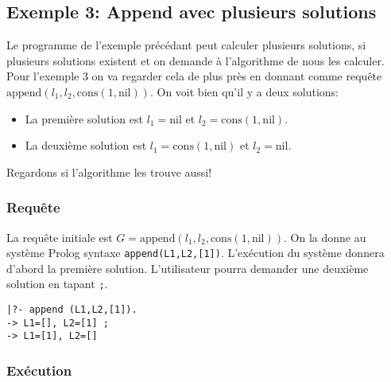 \begin{center}
\noindent{}
\end{center}

\subsection{Exemple 3: Append avec plusieurs solutions}

Le programme de l'exemple précédant peut calculer plusieurs solutions,
si plusieurs solutions existent et on demande à l'algorithme de nous les calculer.
Pour l'exemple 3 on va regarder cela de plus près
en donnant comme requête $\mathrm{append}(l_1, l_2, \mathrm{cons}(1,\mathrm{nil}))$.
On voit bien qu'il y a deux solutions:
\begin{itemize}
\item La première solution est $l_1=\mathrm{nil}$ et $l_2=\mathrm{cons}(1,\mathrm{nil})$.
\item La deuxième solution est $l_1=\mathrm{cons}(1,\mathrm{nil})$ et $l_2=\mathrm{nil}$.
\end{itemize}
Regardons si l'algorithme les trouve aussi!

\subsubsection{Requête}

La requête initiale est $G = \mathrm{append}(l_1, l_2, \mathrm{cons}(1,\mathrm{nil}))$.
On la donne au système Prolog syntaxe \verb+append(L1,L2,[1])+.
L'exécution du système donnera d'abord la première solution.
L'utilisateur pourra demander une deuxième solution en tapant \verb+;+.
\begin{verbatim} 
|?- append (L1,L2,[1]).
-> L1=[], L2=[1] ;
-> L1=[1], L2=[]
\end{verbatim}

\subsubsection{Exécution}

